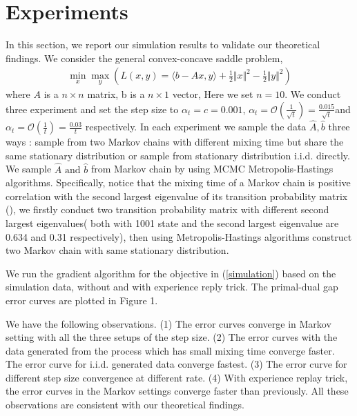 \documentclass[twoside,11pt]{article}
\numberwithin{equation}{section}
\begin{document}
	\section{Experiments}
	In this section, we report our simulation results to validate our theoretical findings. We consider the general convex-concave saddle problem, 
	 \begin{align} \label{simulation}
	\min_x\max_y\left( L(x,y) = \langle b-Ax,y \rangle + \frac{1}{2}\Vert x\Vert^2 - \frac{1}{2}\Vert y\Vert^2 \right)
	\end{align} 
	where $ A $ is a $ n\times n $ matrix, b is a $ n \times 1 $ vector, Here we set $ n=10 $.	We conduct three experiment and set the step size to $ \alpha_t = c = 0.001 $, $\alpha_t = \mathcal{O} (\frac{1}{\sqrt{t}}) = \frac{0.015}{\sqrt{t}} $and $\alpha_t =  \mathcal{O}(\frac{1}{t} )= \frac{0.03}{t} $ respectively. In each experiment	we sample the data $ \hat{A}, \hat{b} $ three ways : sample from  two  Markov chains with different mixing time but share the same stationary distribution or sample  from  stationary distribution  i.i.d. directly.  We sample $ \hat{A} \text{ and } \hat{b}$ from Markov chain by using MCMC Metropolis-Hastings algorithms. Specifically, notice that the mixing time of a Markov chain is positive correlation with the second largest eigenvalue of its transition probability matrix  (\cite{levin2009markov}), we firstly conduct two transition probability matrix with different second largest eigenvalues( both with 1001 state and the second largest eigenvalue are 0.634  and 0.31   respectively), then using Metropolis-Hastings algorithms construct two Markov chain with same stationary distribution.
	
	We run the gradient algorithm for the objective in (\ref{simulation}) based on the simulation data, without and with experience reply trick. The primal-dual gap error curves are plotted in Figure 1.
	
	
	We have the following observations. (1) The error curves converge in Markov setting with all the three setups of the step size. (2) The error curves with the data generated from the process which has small mixing time converge faster. The error curve for i.i.d. generated data converge fastest. (3) The error curve for different step size convergence at different rate. (4) With experience replay trick, the error curves in the Markov settings converge faster than previously.  All these observations are consistent with our theoretical findings.
	
\end{document}

